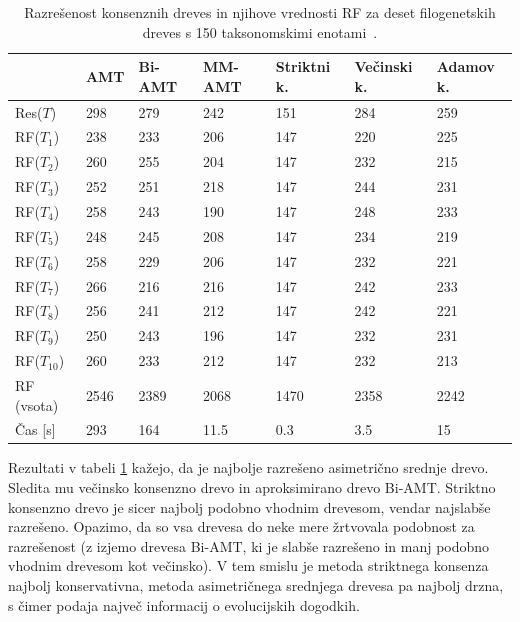 \documentclass[a4paper, 12pt]{book}
\begin{document}
\begin{table}[h!]
	\begin{center}
	{\footnotesize
	\begin{tabular}{ l| l | l | l | l | l | l }
	
	~            & AMT  & Bi-AMT & MM-AMT  & Striktni k. & Večinski k. & Adamov k. \\ \hline
	Res($T$)     & 298  & 279    & 242     & 151         & 284         & 259       \\ \hline
	RF($T_1$)    & 238  & 233    & 206     & 147         & 220         & 225       \\ \hline
	RF($T_2$)    & 260  & 255    & 204     & 147         & 232         & 215       \\ \hline
	RF($T_3$)    & 252  & 251    & 218     & 147         & 244         & 231       \\ \hline
	RF($T_4$)    & 258  & 243    & 190     & 147         & 248         & 233       \\ \hline
	RF($T_5$)    & 248  & 245    & 208     & 147         & 234         & 219       \\ \hline
	RF($T_6$)    & 258  & 229    & 206     & 147         & 232         & 221       \\ \hline
	RF($T_7$)    & 266  & 216    & 216     & 147         & 242         & 233       \\ \hline
	RF($T_8$)    & 256  & 241    & 212     & 147         & 242         & 221       \\ \hline
	RF($T_9$)    & 250  & 243    & 196     & 147         & 232         & 231       \\ \hline
	RF($T_{10}$) & 260  & 233    & 212     & 147         & 232         & 213       \\ \hline
	RF (vsota)   & 2546 & 2389   & 2068    & 1470        & 2358        & 2242      \\ \hline
	Čas [s]      & 293  & 164    & 11.5    & 0.3         & 3.5         & 15        \\ \hline 
	\end{tabular}
	\caption{\label{table-eval-alge}
	 Razrešenost konsenznih dreves in njihove vrednosti RF za deset filogenetskih dreves
	 s 150 taksonomskimi enotami~\cite{taxa150}.
	 }
	}
	\end{center}		
\end{table}
\clearpage
Rezultati v tabeli \ref{table-eval-alge} kažejo, da je najbolje razrešeno asimetrično
srednje drevo. Sledita mu večinsko konsenzno drevo in aproksimirano drevo Bi-AMT. 
Striktno konsenzno drevo je sicer najbolj podobno vhodnim drevesom, vendar najslabše 
razrešeno. Opazimo, da so vsa drevesa do neke mere žrtvovala podobnost za razrešenost
(z izjemo drevesa Bi-AMT, ki je slabše razrešeno in manj podobno vhodnim drevesom kot
večinsko). V tem smislu je metoda striktnega konsenza najbolj konservativna, 
metoda asimetričnega srednjega drevesa pa najbolj drzna, s čimer podaja največ informacij 
o evolucijskih dogodkih. 
\end{document}
